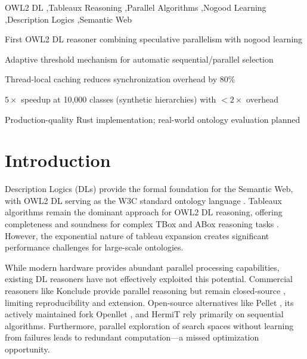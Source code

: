 \documentclass[preprint,12pt]{elsarticle}
\begin{document}
\begin{frontmatter}
\begin{keyword}
OWL2 DL \sep Tableaux Reasoning \sep Parallel Algorithms \sep Nogood Learning \sep Description Logics \sep Semantic Web
\end{keyword}

\end{frontmatter}

\begin{highlights}
\item First OWL2 DL reasoner combining speculative parallelism with nogood learning
\item Adaptive threshold mechanism for automatic sequential/parallel selection
\item Thread-local caching reduces synchronization overhead by 80\%
\item $5\times$ speedup at 10,000 classes (synthetic hierarchies) with $<2\times$ overhead
\item Production-quality Rust implementation; real-world ontology evaluation planned
\end{highlights}


\section{Introduction}
\label{sec:intro}

Description Logics (DLs) provide the formal foundation for the Semantic Web, with OWL2 DL serving as the W3C standard ontology language \cite{owl2}. Tableaux algorithms remain the dominant approach for OWL2 DL reasoning, offering completeness and soundness for complex TBox and ABox reasoning tasks \cite{dlhandbook}. However, the exponential nature of tableau expansion creates significant performance challenges for large-scale ontologies.

While modern hardware provides abundant parallel processing capabilities, existing DL reasoners have not effectively exploited this potential. Commercial reasoners like Konclude provide parallel reasoning but remain closed-source \cite{konclude}, limiting reproducibility and extension. Open-source alternatives like Pellet \cite{pellet}, its actively maintained fork Openllet \cite{openllet}, and HermiT \cite{hermit} rely primarily on sequential algorithms. Furthermore, parallel exploration of search spaces without learning from failures leads to redundant computation---a missed optimization opportunity.
\end{document}
